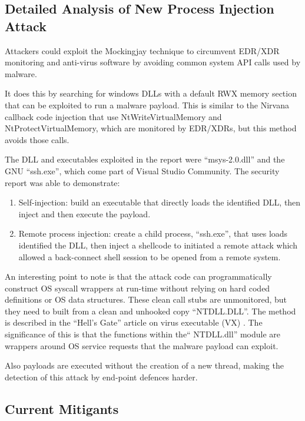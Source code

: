\subsection{Detailed Analysis of New Process Injection Attack}

Attackers could exploit the Mockingjay technique to circumvent EDR/XDR monitoring and anti-virus software by avoiding
common system API calls used by malware.

It does this by searching for windows DLLs with a default RWX memory section that can be exploited to run a malware payload.
This is similar to the Nirvana callback code injection that use NtWriteVirtualMemory and NtProtectVirtualMemory, which are
monitored by EDR/XDRs,  but this method avoids those calls.

The DLL and executables exploited in the report were ``msys-2.0.dll'' and the GNU ``ssh.exe'', which come part of Visual Studio Community.
The security report was able to demonstrate:

\begin{enumerate}
\item Self-injection: build an executable that directly loads the identified DLL, then inject and then execute the payload. 
\item Remote process injection: create a child process, ``ssh.exe'', that uses loads identified the DLL, then inject a shellcode to initiated
  a remote attack which allowed a back-connect shell session to be opened from a remote system.
\end{enumerate}

An interesting point to note is that the attack code can programmatically construct OS syscall wrappers at run-time without relying
on hard coded definitions or OS data structures.  These clean call stubs are unmonitored, but 
they need to built from a clean and unhooked copy ``NTDLL.DLL''.  The method is 
described in the ``Hell's Gate'' article on virus executable (VX) \autocite{smellyvx:2021}.  The significance of this is that
the functions within the`` NTDLL.dll'' module are wrappers around OS service requests that the malware payload can exploit. 

Also payloads are executed without the creation of a new thread, making the detection of this attack by end-point defences harder.


\subsection{Current Mitigants}

